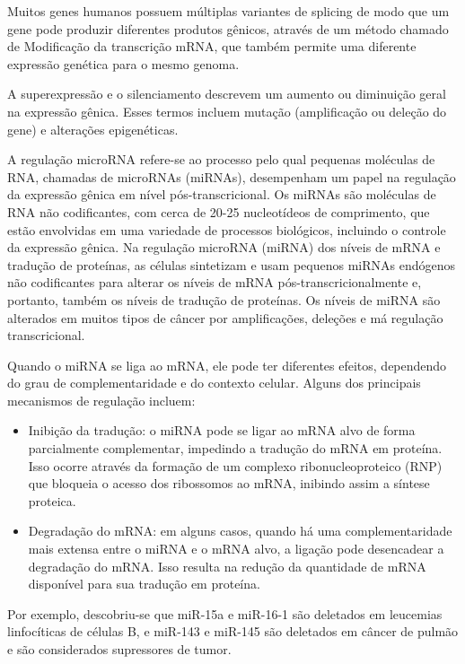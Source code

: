 \documentclass[11pt,a4paper]{article}
\newcounter{exemplo}
\begin{document}
		Muitos genes humanos possuem múltiplas variantes de splicing de modo que um gene pode produzir diferentes produtos gênicos, através de um método chamado de Modificação da transcrição mRNA, que também permite uma diferente expressão genética para o mesmo genoma.

		A superexpressão e o silenciamento descrevem um aumento ou diminuição geral na expressão gênica. Esses termos incluem mutação (amplificação ou deleção do gene) e alterações epigenéticas.

		A regulação microRNA refere-se ao processo pelo qual pequenas moléculas de RNA, chamadas de microRNAs (miRNAs), desempenham um papel na regulação da expressão gênica em nível pós-transcricional. Os miRNAs são moléculas de RNA não codificantes, com cerca de 20-25 nucleotídeos de comprimento, que estão envolvidas em uma variedade de processos biológicos, incluindo o controle da expressão gênica. Na regulação microRNA (miRNA) dos níveis de mRNA e tradução de proteínas, as células sintetizam e usam pequenos miRNAs endógenos não codificantes para alterar os níveis de mRNA pós-transcricionalmente e, portanto, também os níveis de tradução de proteínas. Os níveis de miRNA são alterados em muitos tipos de câncer por amplificações, deleções e má regulação transcricional.

		Quando o miRNA se liga ao mRNA, ele pode ter diferentes efeitos, dependendo do grau de complementaridade e do contexto celular. Alguns dos principais mecanismos de regulação incluem:

		\begin{itemize}
			\item Inibição da tradução: o miRNA pode se ligar ao mRNA alvo de forma parcialmente complementar, impedindo a tradução do mRNA em proteína. Isso ocorre através da formação de um complexo ribonucleoproteico (RNP) que bloqueia o acesso dos ribossomos ao mRNA, inibindo assim a síntese proteica.
			\item Degradação do mRNA: em alguns casos, quando há uma complementaridade mais extensa entre o miRNA e o mRNA alvo, a ligação pode desencadear a degradação do mRNA. Isso resulta na redução da quantidade de mRNA disponível para sua tradução em proteína.
		\end{itemize}

		Por exemplo, descobriu-se que miR-15a e miR-16-1 são deletados em leucemias linfocíticas de células B, e miR-143 e miR-145 são deletados em câncer de pulmão e são considerados supressores de tumor. 
		
\end{document}
